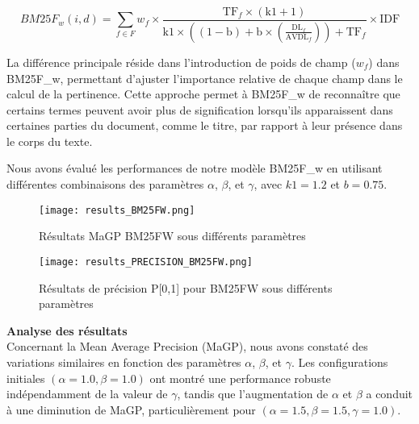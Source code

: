 \documentclass[a4paper, 12pt]{article}
\begin{document}
\begin{equation}
\text{$BM25F_w$}(i, d) = \sum_{f \in F} w_f \times \frac{\text{TF}_{f} \times (\text{k1} + 1)}{\text{k1} \times \left((1 - \text{b}) + \text{b} \times \left(\frac{\text{DL}_f}{\text{AVDL}_f}\right)\right) + \text{TF}_f} \times \text{IDF}
\end{equation}

La différence principale réside dans l'introduction de poids de champ ($w_f$) dans BM25F\_w, permettant d'ajuster l'importance relative de chaque champ dans le calcul de la pertinence. Cette approche permet à BM25F\_w de reconnaître que certains termes peuvent avoir plus de signification lorsqu'ils apparaissent dans certaines parties du document, comme le titre, par rapport à leur présence dans le corps du texte.

Nous avons évalué les performances de notre modèle BM25F\_w en utilisant différentes combinaisons des paramètres \(\alpha\), \(\beta\), et \(\gamma\), avec \(k1=1.2\) et \(b=0.75\). 

\begin{figure}[H]
    \centering
    \begin{minipage}{0.48\textwidth}
        \centering
        \texttt{[image: results\_BM25FW.png]}
        \caption{Résultats MaGP BM25FW sous différents paramètres}
        \label{fig:magp_bm25fw}
    \end{minipage}\hfill
    \begin{minipage}{0.48\textwidth}
        \centering
        \texttt{[image: results\_PRECISION\_BM25FW.png]}
        \caption{Résultats de précision P[0,1] pour BM25FW sous différents paramètres}
        \label{fig:precision_bm25fw}
    \end{minipage}
\end{figure}

\textbf{Analyse des résultats \\}
Concernant la Mean Average Precision (MaGP), nous avons constaté des variations similaires en fonction des paramètres \(\alpha\), \(\beta\), et \(\gamma\). Les configurations initiales \((\alpha=1.0, \beta=1.0)\) ont montré une performance robuste indépendamment de la valeur de \(\gamma\), tandis que l'augmentation de \(\alpha\) et \(\beta\) a conduit à une diminution de MaGP, particulièrement pour \((\alpha=1.5, \beta=1.5, \gamma=1.0)\).
\end{document}
